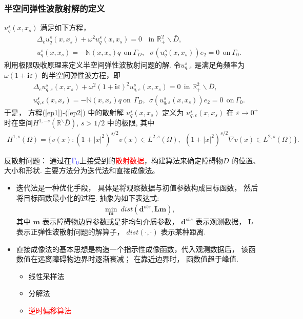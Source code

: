\documentclass[8pt]{beamer}
\newcommand{\R}{\mathbb{R}}
\renewcommand{\i}{\mathbf{i}}
\newcommand{\om}{\omega}
\newcommand{\ep}{\varepsilon}
\newcommand{\Ga}{\Gamma}
\newcommand{\Om}{\Omega}
\newcommand{\bks}{\backslash}
\renewcommand{\i}{\mathbf{i}}
\newcommand{\N}{\mathbb{N}}
\newcommand{\be}{\begin{eqnarray}}
\newcommand{\ee}{\end{eqnarray}}
\newcommand{\ben}{\begin{eqnarray*}}
\newcommand{\een}{\end{eqnarray*}}
\begin{document}
\begin{frame}
\frametitle{半空间弹性波散射解的定义}
$u_q^s(x,x_s)$ 满足如下方程，
\be
& &\Delta_e u_q^s(x,x_s)+ \omega^2u_q^s(x,x_s)= 0 \ \ \ \ \mbox{in }\R_+^2\bks \bar{D},\label{ep1}\\
& &u^s_q(x,x_s)=-\N(x,x_s)q \ \ \mbox{on} \ \Ga_D,\ \ \ \sigma(u_q^s(x,x_s))e_2=0 \ \ \mbox{on} \ \Ga_0.\label{ep2}
\ee
利用极限吸收原理来定义半空间弹性波散射问题的解.  令$u^s_{q,\ep}$ 是满足角频率为 $\om(1+\i\ep)$ 的半空间弹性波方程，即
\ben
& &\Delta_e u_{q,\ep}^s(x,x_s)+ \omega^2(1+\i\ep)^2 u_{q,\ep}^s(x,x_s)= 0 \ \  \mbox{in }\R_+^2\bks \bar{D},\label{p12}\\
& &u^s_{q,\ep}(x,x_s)=-\N(x,x_s)q \  \mbox{on} \ \  \Ga_D,\ \ \sigma(u_{q,\ep}^s(x,x_s))e_2=0 \ \  \mbox{on} \  \Ga_0 .\label{p22}
\een
于是， 方程(\ref{ep1})-(\ref{ep2}) 中的散射解 $u_q^s(x,x_s)$ 定义为 $u_{q,\ep}^s(x,x_s)$ 在 $\ep\to 0^+$ 时在空间$H^{1,-s}(\R^\bks\bar{D})$, $s>1/2$ 中的极限, 其中
\ben
H^{1,s}(\Om)=\{v(x): (1+|x|^2)^{s/2}v(x)\in L^{2,s}(\Om) , \ \  (1+|x|^2)^{s/2}\nabla v(x)\in L^{2,s}(\Om)   \}.
\een
\end{frame}
\begin{frame}
	\begin{block}{反散射问题：}
		 通过在$\textcolor{blue}{\Gamma_0}$上接受到的\textcolor{red}{散射数据}，构建算法来确定障碍物$D$ 的位置、大小和形状. 主要方法分为迭代法和直接成像法。
	\end{block}
\vspace{.5cm}
\pause
\begin{itemize}
	\item 迭代法是一种优化手段， 具体是将观察数据与初值参数构成目标函数， 然后将目标函数最小化的过程.  抽象为如下表达式:
	\ben
	\min_{\mathbf{m}} \ dist(\mathbf{d}^{obs},\mathbf{{L}}\mathbf{m}),
	\een
	其中 $\mathbf m$ 表示障碍物边界参数或是非均匀介质参数， $\mathbf{d}^{obs}$ 表示观测数据， $\mathbf{{L}}$ 表示正弹性波散射问题的解算子， $dist(\cdot,\cdot)$ 表示某种距离.
	
	\bigskip
	\pause
	\item 直接成像法的基本思想是构造一个指示性成像函数，代入观测数据后， 该函数值在远离障碍物边界时逐渐衰减； 在靠近边界时， 函数值趋于峰值.
	\begin{itemize}
		\item 线性采样法
		\item 分解法
		\item \textcolor{red}{逆时偏移算法}
	\end{itemize}
\end{itemize} 
\end{frame}
\end{document}
